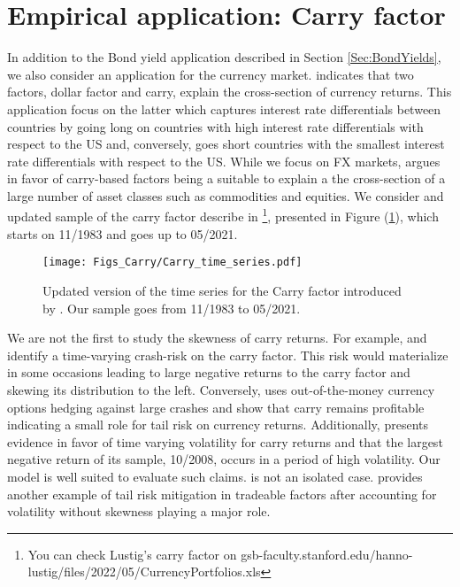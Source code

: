\documentclass{article}
\begin{document}
\section{Empirical application: Carry factor}\label{Sec:Carry}

In addition to the Bond yield application described in Section \ref{Sec:BondYields}, we also consider an application for the  currency market. \cite{lustig2011common} indicates that two factors, dollar factor and carry, explain the cross-section of currency returns. This application focus on the latter which captures interest rate differentials between countries by going long on countries with high interest rate differentials with respect to the US and, conversely,  goes short countries with the smallest interest rate differentials with respect to the US. While we focus on FX markets, \cite{koijen2018carry} argues in favor of carry-based factors being a suitable to explain a the cross-section of a large number of asset classes such as commodities and equities. We consider and updated sample of the carry factor describe in \cite{lustig2011common}\footnote{You can check Lustig's carry factor on gsb-faculty.stanford.edu/hanno-lustig/files/2022/05/CurrencyPortfolios.xls}, presented in Figure (\ref{Fig:Carry_time_series}), which starts on 11/1983 and goes up to 05/2021.

\begin{figure}[h!]
\centering
\texttt{[image: Figs\_Carry/Carry\_time\_series.pdf]}
\caption{Updated version of the time series for the Carry factor introduced by \cite{lustig2011common}. Our sample goes from 11/1983 to 05/2021.} 
\label{Fig:Carry_time_series}
\end{figure} 

We are not the first to study the skewness of carry returns. For example, \cite{burnside2011peso} and \cite{rafferty2012currency} identify a time-varying crash-risk on the carry factor. This risk would materialize in some occasions leading to large negative returns to the carry factor and skewing its distribution to the left. Conversely, \cite{jurek2014crash} uses out-of-the-money currency options hedging against large crashes and show that carry remains profitable indicating a small role for tail risk on currency returns. Additionally, \cite{jurek2014crash} presents evidence in favor of time varying volatility for carry returns and that the largest negative return of its sample, 10/2008, occurs in a period of high volatility. Our model is well suited to evaluate such claims. \cite{jurek2014crash} is not an isolated case. \cite{barroso2015momentum} provides another example of tail risk mitigation in tradeable factors after accounting for volatility without skewness playing a major role. 
\end{document}
